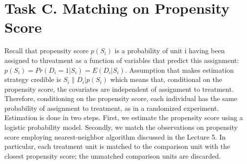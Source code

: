 \section*{Task C. Matching on Propensity Score}

\noindent Recall that propensity score $p(S_i)$ is a probability of unit i having been assigned to threatment as a function of variables that predict this assignment: $p(S_i) = Pr(D_i = 1|S_i) = E(D_i|S_i)$. Assumption that makes estimation strategy credible is $S_i \parallel D_i|p(S_i)$ which means that, conditional on the propensity score, the covariates are independent of assignment to treatment. Therefore, conditioning on the propensity score, each individual has the same probability of assignment to treatment, as in a randomized experiment. \\

\noindent Estimation is done in two steps. First, we estimate the propensity score using a logistic probability model. Secondly, we match the observations on propensity score employing nearest-neighbor algorithm discussed in the Lecture 5. In particular,  each treatment unit is matched to the comparison unit with the closest propensity score; the unmatched comparison units are discarded. 

